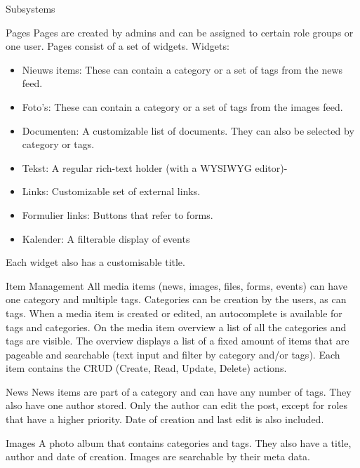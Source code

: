 \documentclass[10pt,a4paper]{article}
\begin{document}
\begin{section}{Subsystems}
    \begin{subsection}{Pages}
        Pages are created by admins and can be assigned to certain role groups or one
        user. Pages consist of a set of widgets.
        Widgets:
        \begin{itemize}
            \item Nieuws items: These can contain a category or a set of tags from the
            news feed.
            \item Foto's: These can contain a category or a set of tags from the
            images feed.
            \item Documenten: A customizable list of documents. They can also be selected
            by category or tags.
            \item Tekst: A regular rich-text holder (with a WYSIWYG editor)-
            \item Links: Customizable set of external links.
            \item Formulier links: Buttons that refer to forms.
            \item Kalender: A filterable display of events
        \end{itemize}
        Each widget also has a customisable title.
    \end{subsection}
    
    \begin{subsection}{Item Management}
        All media items (news, images, files, forms, events) can have one category and
        multiple tags. Categories can be creation by the users, as can tags.
        When a media item is created or edited, an autocomplete is available for tags
        and categories.
        On the media item overview a list of all the categories and tags are visible.
        The overview displays a list of a fixed amount of items that are pageable and
        searchable (text input and filter by category and/or tags).
        Each item contains the CRUD (Create, Read, Update, Delete) actions.
    \end{subsection}
    
    \begin{subsection}{News}
        News items are part of a category and can have any number of tags. They also have
        one author stored. Only the author can edit the post, except for roles that have
        a higher priority. Date of creation and last edit is also included.
    \end{subsection}
    
    \begin{subsection}{Images}
        A photo album that contains categories and tags. They also have a title, author
        and date of creation. Images are searchable by their meta data.
    \end{subsection}
    

\end{section}
\end{document}
